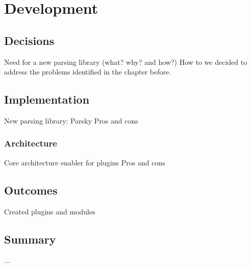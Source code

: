 \chapter{Development}
		
	\section{Decisions}
	
	Need for a new parsing library (what? why? and how?)
	How to we decided to address the problems identified in the chapter before.
	
    \section{Implementation}
    
    New parsing library: Parsky
    Pros and cons
    
    \subsection{Architecture}
    
    Core architecture enabler for plugins
    Pros and cons
    
    \section{Outcomes}
    
    Created plugins and modules
    
	\section{Summary}
	
	...